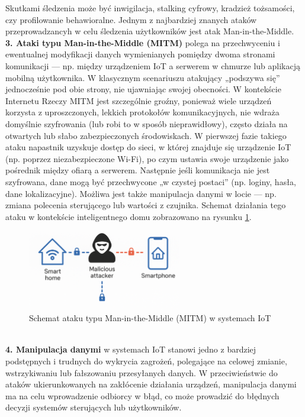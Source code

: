 Skutkami śledzenia może być inwigilacja, stalking cyfrowy, kradzież tożsamości, czy profilowanie behawioralne. Jednym z najbardziej znanych ataków przeprowadzancyh w celu śledzenia użytkowników jest atak Man-in-the-Middle.
\vspace{10pt} \\
\textbf{3. Ataki typu Man-in-the-Middle (MITM)} polega na przechwyceniu i ewentualnej modyfikacji danych wymienianych pomiędzy dwoma stronami komunikacji — np. między urządzeniem IoT a serwerem w chmurze lub aplikacją mobilną użytkownika. W klasycznym scenariuszu atakujący „podszywa się” jednocześnie pod obie strony, nie ujawniając swojej obecności. W kontekście Internetu Rzeczy MITM jest szczególnie groźny, ponieważ wiele urządzeń korzysta z uproszczonych, lekkich protokołów komunikacyjnych, nie wdraża domyślnie szyfrowania (lub robi to w sposób nieprawidłowy), często działa na otwartych lub słabo zabezpieczonych środowiskach. W pierwszej fazie takiego ataku napastnik uzyskuje dostęp do sieci, w której znajduje się urządzenie IoT (np. poprzez niezabezpieczone Wi-Fi), po czym ustawia swoje urządzenie jako pośrednik między ofiarą a serwerem. Następnie jeśli komunikacja nie jest szyfrowana, dane mogą być przechwycone „w czystej postaci” (np. loginy, hasła, dane lokalizacyjne). Możliwa jest także manipulacja danymi w locie — np. zmiana polecenia sterującego lub wartości z czujnika. Schemat działania tego ataku w kontekście inteligentnego domu zobrazowano na rysunku \ref{fig:Schemat ataku typu Man-in-the-Middle (MITM) w systemach IoT}.
\begin{figure}[h]
    \centering
    \includegraphics[width=0.6\textwidth]{pictures/MITM.png}
    \caption{Schemat ataku typu Man-in-the-Middle (MITM) w systemach IoT}
    \label{fig:Schemat ataku typu Man-in-the-Middle (MITM) w systemach IoT}
\end{figure}
\vspace{10pt} \\
\textbf{4. Manipulacja danymi} w systemach IoT stanowi jedno z bardziej podstępnych i trudnych do wykrycia zagrożeń, polegające na celowej zmianie, wstrzykiwaniu lub fałszowaniu przesyłanych danych. W przeciwieństwie do ataków ukierunkowanych na zakłócenie działania urządzeń, manipulacja danymi ma na celu wprowadzenie odbiorcy w błąd, co może prowadzić do błędnych decyzji systemów sterujących lub użytkowników.

